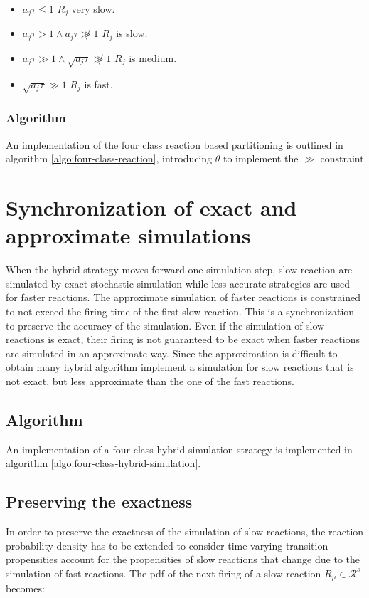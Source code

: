   \begin{itemize}
    \item $a_j\tau\le 1$ $R_j$ very slow.
    \item $a_j\tau > 1\land a_j\tau\not\gg 1$ $R_j$ is slow.
    \item $a_j\tau\gg 1\land\sqrt{a_j\tau}\not\gg 1$ $R_j$ is medium.
    \item $\sqrt{a_j\tau}\gg 1$ $R_j$ is fast.
  \end{itemize}

    \subsubsection{Algorithm}
    An implementation of the four class reaction based partitioning is outlined in algorithm \ref{algo:four-class-reaction}, introducing $\theta$ to implement the $\gg$ constraint

    

\section{Synchronization of exact and approximate simulations}
When the hybrid strategy moves forward one simulation step, slow reaction are simulated by exact stochastic simulation while less accurate strategies are used for faster reactions.
The approximate simulation of faster reactions is constrained to not exceed the firing time of the first slow reaction.
This is a synchronization to preserve the accuracy of the simulation.
Even if the simulation of slow reactions is exact, their firing is not guaranteed to be exact when faster reactions are simulated in an approximate way.
Since the approximation is difficult to obtain many hybrid algorithm implement a simulation for slow reactions that is not exact, but less approximate than the one of the fast reactions.

  \subsection{Algorithm}
  An implementation of a four class hybrid simulation strategy is implemented in algorithm \ref{algo:four-class-hybrid-simulation}.

  

  \subsection{Preserving the exactness}
  In order to preserve the exactness of the simulation of slow reactions, the reaction probability density has to be extended to consider time-varying transition propensities account for the propensities of slow reactions that change due to the simulation of fast reactions.
  The pdf of the next firing of a slow reaction $R_\mu\in\mathcal{R}^s$ becomes:

